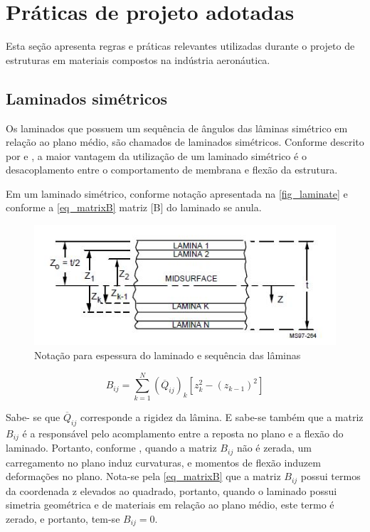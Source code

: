 
\section{Práticas de projeto adotadas}
Esta seção apresenta regras e práticas relevantes utilizadas durante o projeto de estruturas em materiais compostos na indústria aeronáutica.

\subsection{Laminados simétricos}
Os laminados que possuem um sequência	de ângulos das lâminas simétrico em relação ao plano médio, são chamados de laminados simétricos. Conforme descrito por \cite{mil2002handbook} e \cite{niucomposite}, a maior vantagem da utilização de um laminado simétrico é o desacoplamento entre o comportamento de membrana e flexão da estrutura.

Em um laminado simétrico, conforme notação apresentada na \autoref{fig_laminate} e conforme a \autoref{eq_matrixB} matriz [B] do laminado se anula.

\begin{figure}[h]
	\caption{\label{fig_laminate}Notação para espessura do laminado e sequência das lâminas}
  \centering
  \includegraphics[scale=1.0]{figura/Laminate}
\end{figure}

\begin{equation} \label{eq_matrixB}
B_{ij}
=
\sum_{k=1}^N (\overline{Q}_{ij})_k [z_k^2 - (z_{k-1})^2]
\end{equation}

Sabe- se que $ \overline{Q}_{ij} $ corresponde a rigidez da lâmina. E sabe-se também que a matriz $ B_{ij} $ é a responsável pelo acomplamento entre a reposta no plano e a flexão do laminado. Portanto, conforme \cite{nasa1997guidelines}, quando a matriz $ B_{ij} $ não é zerada, um carregamento no plano induz curvaturas, e momentos de flexão induzem deformações no plano. Nota-se pela \autoref{eq_matrixB} que a matriz $ B_{ij} $ possui termos da coordenada z elevados ao quadrado, portanto, quando o laminado possui simetria geométrica e de materiais em relação ao plano médio, este termo é zerado, e portanto, tem-se $ B_{ij} = 0$.

